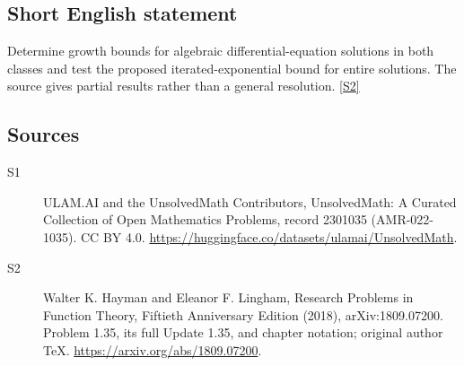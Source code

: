 \documentclass[11pt]{article}
\newcommand{\sref}[2]{\hyperlink{source:#1:#2}{[S#2]}}
\begin{document}
\subsection{Short English statement}
Determine growth bounds for algebraic differential-equation solutions in both classes and test the proposed iterated-exponential bound for entire solutions. The source gives partial results rather than a general resolution. \sref{2301035}{2}
\subsection{Sources}
\begin{description}
\item[\hypertarget{source:2301035:1}{S1}] ULAM.AI and the UnsolvedMath Contributors, UnsolvedMath: A Curated Collection of Open Mathematics Problems, record 2301035 (AMR-022-1035). CC BY 4.0. \url{https://huggingface.co/datasets/ulamai/UnsolvedMath}.
\item[\hypertarget{source:2301035:2}{S2}] Walter K. Hayman and Eleanor F. Lingham, Research Problems in Function Theory, Fiftieth Anniversary Edition (2018), arXiv:1809.07200. Problem 1.35, its full Update 1.35, and chapter notation; original author TeX. \url{https://arxiv.org/abs/1809.07200}.
\end{description}
\label{end:2301035}
\end{document}
